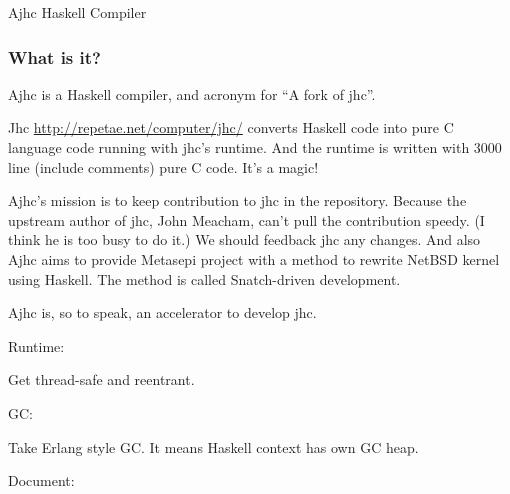 \documentclass[DIV16,twocolumn,10pt]{scrreprt}
\begin{document}
\begin{hcarentry}{Ajhc Haskell Compiler}
\makeheader

\newcommand{\WhatsIsIt}{\subsubsection*{What is it?}}
\newcommand{\Usage}{\subsubsection*{Usage}}
\newcommand{\License}{\subsubsection*{License}}
\newcommand{\Demo}{\subsubsection*{Demonstrations}}

\WhatsIsIt

Ajhc is a Haskell compiler, and acronym for ``A fork of jhc''.

Jhc \url{http://repetae.net/computer/jhc/} converts Haskell code into pure C language code running with jhc's runtime. And the runtime is written with 3000 line (include comments) pure C code. It's a magic!

Ajhc's mission is to keep contribution to jhc in the repository. Because the upstream author of jhc, John Meacham, can't pull the contribution speedy. (I think he is too busy to do it.) We should feedback jhc any changes. And also Ajhc aims to provide Metasepi project with a method to rewrite NetBSD kernel using Haskell. The method is called Snatch-driven development.

Ajhc is, so to speak, an accelerator to develop jhc.

\WhatsNew

\noindent Runtime:

Get thread-safe and reentrant.

\vspace*{10pt}

\noindent GC:

Take Erlang style GC. It means Haskell context has own GC heap.

\vspace*{10pt}

\noindent Document:


\end{hcarentry}
\end{document}
